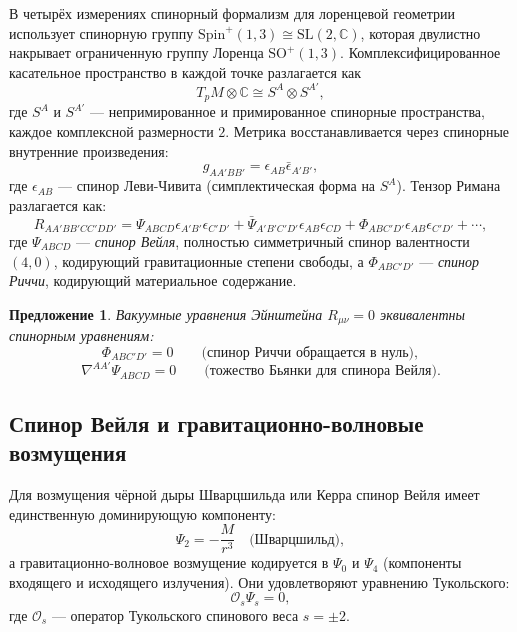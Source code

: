 \documentclass[12pt,a4paper]{article}
\newtheorem{proposition}[theorem]{Предложение}
\theoremstyle{definition}
\theoremstyle{remark}
\newcommand{\CC}{\mathbb{C}}
\newcommand{\SL}{\mathrm{SL}}
\newcommand{\SO}{\mathrm{SO}}
\newcommand{\cO}{\mathcal{O}}
\begin{document}
В четырёх измерениях спинорный формализм для лоренцевой геометрии использует спинорную группу $\mathrm{Spin}^+(1,3) \cong \SL(2, \CC)$, которая двулистно накрывает ограниченную группу Лоренца $\SO^+(1,3)$. Комплексифицированное касательное пространство в каждой точке разлагается как
\begin{equation}
T_p M \otimes \CC \cong S^A \otimes S^{A'},
\end{equation}
где $S^A$ и $S^{A'}$ --- непримированное и примированное спинорные пространства, каждое комплексной размерности $2$. Метрика восстанавливается через спинорные внутренние произведения:
\begin{equation}
g_{AA'BB'} = \epsilon_{AB} \bar\epsilon_{A'B'},
\end{equation}
где $\epsilon_{AB}$ --- спинор Леви-Чивита (симплектическая форма на $S^A$). Тензор Римана разлагается как:
\begin{equation}
R_{AA'BB'CC'DD'} = \Psi_{ABCD} \epsilon_{A'B'} \epsilon_{C'D'} + \bar\Psi_{A'B'C'D'} \epsilon_{AB} \epsilon_{CD} + \Phi_{ABC'D'} \epsilon_{AB} \epsilon_{C'D'} + \cdots,
\end{equation}
где $\Psi_{ABCD}$ --- \emph{спинор Вейля}, полностью симметричный спинор валентности $(4,0)$, кодирующий гравитационные степени свободы, а $\Phi_{ABC'D'}$ --- \emph{спинор Риччи}, кодирующий материальное содержание.

\begin{proposition}
Вакуумные уравнения Эйнштейна $R_{\mu\nu} = 0$ эквивалентны спинорным уравнениям:
\begin{equation}
\Phi_{ABC'D'} = 0 \qquad \text{(спинор Риччи обращается в нуль)},
\end{equation}
\begin{equation}
\nabla^{AA'} \Psi_{ABCD} = 0 \qquad \text{(тожество Бьянки для спинора Вейля)}.
\end{equation}
\end{proposition}

\subsection{Спинор Вейля и гравитационно-волновые возмущения}

Для возмущения чёрной дыры Шварцшильда или Керра спинор Вейля имеет единственную доминирующую компоненту:
\begin{equation}
\Psi_2 = -\frac{M}{r^3} \quad \text{(Шварцшильд)},
\end{equation}
а гравитационно-волновое возмущение кодируется в $\Psi_0$ и $\Psi_4$ (компоненты входящего и исходящего излучения). Они удовлетворяют уравнению Тукольского:
\begin{equation}
\cO_s \Psi_s = 0,
\end{equation}
где $\cO_s$ --- оператор Тукольского спинового веса $s = \pm 2$.
\end{document}
